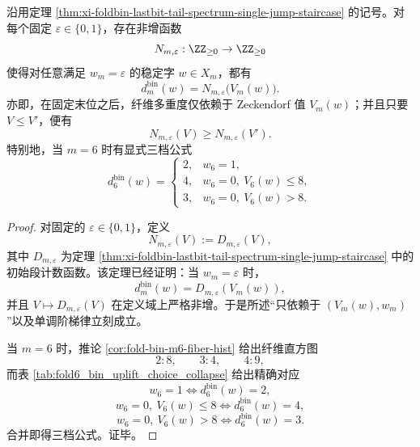 \begin{theorem}\label{thm:xi-foldbin-zeckendorf-monotone-staircase-law}
沿用定理 \ref{thm:xi-foldbin-lastbit-tail-spectrum-single-jump-staircase} 的记号。对每个固定 \(\varepsilon\in\{0,1\}\)，存在非增函数
\[
N_{m,\varepsilon}:\ZZ_{\ge 0}\to \ZZ_{\ge 0}
\]
使得对任意满足 \(w_m=\varepsilon\) 的稳定字 \(w\in X_m\)，都有
\[
d_m^{\mathrm{bin}}(w)=N_{m,\varepsilon}\!\bigl(V_m(w)\bigr).
\]
亦即，在固定末位之后，纤维多重度仅依赖于 Zeckendorf 值 \(V_m(w)\)；并且只要 \(V\le V'\)，便有
\[
\boxed{\;
N_{m,\varepsilon}(V)\ge N_{m,\varepsilon}(V').\;}
\]
特别地，当 \(m=6\) 时有显式三档公式
\[
d_6^{\mathrm{bin}}(w)=
\begin{cases}
2,& w_6=1,\\[4pt]
4,& w_6=0,\ V_6(w)\le 8,\\[4pt]
3,& w_6=0,\ V_6(w)>8.
\end{cases}
\]
\end{theorem}
\begin{proof}
对固定的 \(\varepsilon\in\{0,1\}\)，定义
\[
N_{m,\varepsilon}(V):=D_{m,\varepsilon}(V),
\]
其中 \(D_{m,\varepsilon}\) 为定理
\ref{thm:xi-foldbin-lastbit-tail-spectrum-single-jump-staircase} 中的初始段计数函数。该定理已经证明：当 \(w_m=\varepsilon\) 时，
\[
d_m^{\mathrm{bin}}(w)=D_{m,\varepsilon}(V_m(w)),
\]
并且 \(V\mapsto D_{m,\varepsilon}(V)\) 在定义域上严格非增。于是所述“只依赖于 \((V_m(w),w_m)\)”以及单调阶梯律立刻成立。

当 \(m=6\) 时，推论 \ref{cor:fold-bin-m6-fiber-hist} 给出纤维直方图
\[
2:8,\qquad 3:4,\qquad 4:9,
\]
而表 \ref{tab:fold6_bin_uplift_choice_collapse} 给出精确对应
\[
w_6=1 \Longleftrightarrow d_6^{\mathrm{bin}}(w)=2,
\]
\[
w_6=0,\ V_6(w)\le 8 \Longleftrightarrow d_6^{\mathrm{bin}}(w)=4,
\]
\[
w_6=0,\ V_6(w)>8 \Longleftrightarrow d_6^{\mathrm{bin}}(w)=3.
\]
合并即得三档公式。证毕。
\end{proof}

